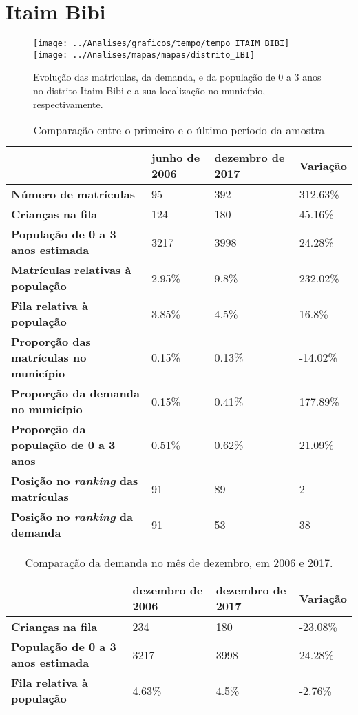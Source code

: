 \section{Itaim Bibi}
\begin{figure}[H]
	\centering
	\texttt{[image: ../Analises/graficos/tempo/tempo\_ITAIM\_BIBI]}
	\texttt{[image: ../Analises/mapas/mapas/distrito\_IBI]}
	\caption{Evolução das matrículas, da demanda, e da população de 0 a 3 anos no distrito Itaim Bibi e a sua localização no município, respectivamente.}
\end{figure}
\begin{table}[H]
	\begin{tabular}{|l|l|l|l|}
		\hline
		\textbf{}                                      & \textbf{junho de 2006}       & \textbf{dezembro de 2017}    & \textbf{Variação} \\ \hline
		\textbf{Número de matrículas}                  & 95 & 392 & 312.63\% \\ \hline
		\textbf{Crianças na fila}                      & 124 & 180 & 45.16\% \\ \hline
		\textbf{População de 0 a 3 anos estimada}      & 3217 & 3998 & 24.28\% \\ \hline
		\textbf{Matrículas relativas à população}      & 2.95\% & 9.8\% & 232.02\% \\ \hline
		\textbf{Fila relativa à população}             & 3.85\% & 4.5\% & 16.8\% \\ \hline
		\textbf{Proporção das matrículas no município} & 0.15\% & 0.13\% & -14.02\% \\ \hline
		\textbf{Proporção da demanda no município}     & 0.15\% & 0.41\% & 177.89\% \\ \hline
		\textbf{Proporção da população de 0 a 3 anos}  & 0.51\% & 0.62\% & 21.09\% \\ \hline
		\textbf{Posição no \textit{ranking} das matrículas}     & 91 & 89 & 2 \\ \hline
		\textbf{Posição no \textit{ranking} da demanda}         & 91 & 53 & 38 \\ \hline
	\end{tabular}
	\caption{Comparação entre o primeiro e o último período da amostra}
\end{table}
\begin{table}[H]
	\begin{tabular}{|l|l|l|l|}
		\hline
		\textbf{}                                 & \textbf{dezembro de 2006} & \textbf{dezembro de 2017} & \textbf{Variação} \\ \hline
		\textbf{Crianças na fila}                      & 234 & 180 & -23.08\% \\ \hline
		\textbf{População de 0 a 3 anos estimada}      & 3217 & 3998 & 24.28\% \\ \hline
		\textbf{Fila relativa à população}             & 4.63\% & 4.5\% & -2.76\% \\ \hline
	\end{tabular}
	\caption{Comparação da demanda no mês de dezembro, em 2006 e 2017.}
\end{table}
